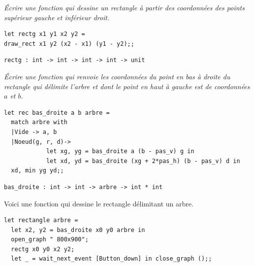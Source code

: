 \begin{Exercise}\it 
Écrire une fonction  qui dessine un rectangle à partir des coordonnées des points supérieur gauche et inférieur droit.
\end{Exercise}
\begin{Answer}
\begin{lstlisting}
let rectg x1 y1 x2 y2 =
draw_rect x1 y2 (x2 - x1) (y1 - y2);;
\end{lstlisting}
\end{Answer}
\begin{lstlisting}
rectg : int -> int -> int -> int -> unit
\end{lstlisting}
\begin{Exercise}\it 
Écrire une fonction  qui renvoie les coordonnées du point en bas à  droite du rectangle qui délimite l'arbre et dont le point en haut à gauche est de coordonnées $a$ et $b$.
\end{Exercise}
\begin{Answer}
\begin{lstlisting}
let rec bas_droite a b arbre =
  match arbre with
  |Vide -> a, b
  |Noeud(g, r, d)-> 
            let xg, yg = bas_droite a (b - pas_v) g in
            let xd, yd = bas_droite (xg + 2*pas_h) (b - pas_v) d in
  xd, min yg yd;;
\end{lstlisting}
\end{Answer}
\begin{lstlisting}
bas_droite : int -> int -> arbre -> int * int
\end{lstlisting}

Voici une fonction qui dessine le rectangle délimitant un arbre.
\begin{lstlisting}
let rectangle arbre =
  let x2, y2 = bas_droite x0 y0 arbre in
  open_graph " 800x900";
  rectg x0 y0 x2 y2;
  let _ = wait_next_event [Button_down] in close_graph ();;
\end{lstlisting}

